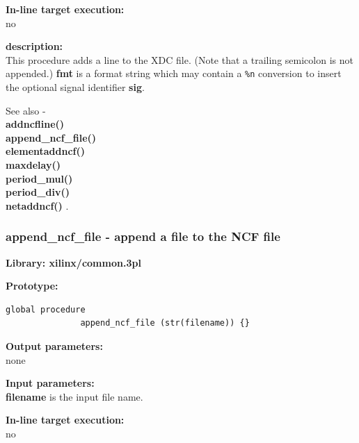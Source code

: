             {\bf In-line target execution:} \\
            no

            {\bf description:} \\
            This procedure adds a line to the XDC file.
            (Note that a trailing semicolon is not appended.)
            {\bf fmt} is a format string which may contain a \verb'%n'
            conversion to insert the optional signal identifier {\bf sig}.

            See also - \\
            {\bf addncfline()} \\
            {\bf append\_ncf\_file()} \\
            {\bf elementaddncf()} \\
            {\bf maxdelay()} \\
            {\bf period\_mul()} \\
            {\bf period\_div()} \\
            {\bf netaddncf()} .










        \subsubsection{append\_ncf\_file - append a file to the NCF file}\label{sec:lpappncf}
            
            {\bf Library: xilinx/common.3pl}

            {\bf Prototype:} \\
            \vsp
            \begin{lstlisting}[gobble=12, language=threepl]
               global procedure
               append_ncf_file (str(filename)) {}
            \end{lstlisting}

            {\bf Output parameters:} \\
            none

            {\bf Input parameters:} \\            
            {\bf filename} is the input file name.
        
            {\bf In-line target execution:} \\
            no

